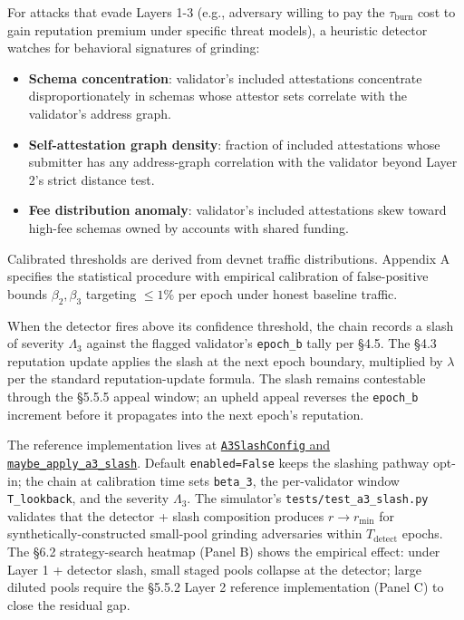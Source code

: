 \documentclass[
  11pt,
]{article}
\providecommand{\tightlist}{%
  \setlength{\itemsep}{0pt}\setlength{\parskip}{0pt}}
\begin{document}
For attacks that evade Layers 1-3 (e.g., adversary willing to pay the
\(\tau_{\text{burn}}\) cost to gain reputation premium under specific
threat models), a heuristic detector watches for behavioral signatures
of grinding:

\begin{itemize}
\tightlist
\item
  \textbf{Schema concentration}: validator's included attestations
  concentrate disproportionately in schemas whose attestor sets
  correlate with the validator's address graph.
\item
  \textbf{Self-attestation graph density}: fraction of included
  attestations whose submitter has any address-graph correlation with
  the validator beyond Layer 2's strict distance test.
\item
  \textbf{Fee distribution anomaly}: validator's included attestations
  skew toward high-fee schemas owned by accounts with shared funding.
\end{itemize}

Calibrated thresholds are derived from devnet traffic distributions.
Appendix A specifies the statistical procedure with empirical
calibration of false-positive bounds \(\beta_2, \beta_3\) targeting
\(\leq 1\%\) per epoch under honest baseline traffic.

When the detector fires above its confidence threshold, the chain
records a slash of severity \(\Lambda_3\) against the flagged
validator's \texttt{epoch\_b} tally per §4.5. The §4.3 reputation update
applies the slash at the next epoch boundary, multiplied by \(\lambda\)
per the standard reputation-update formula. The slash remains
contestable through the §5.5.5 appeal window; an upheld appeal reverses
the \texttt{epoch\_b} increment before it propagates into the next
epoch's reputation.

The reference implementation lives at
\href{https://github.com/ligate-io/ligate-research/blob/main/prototypes/poua-sim/src/poua_sim/a3_slash.py}{\texttt{A3SlashConfig}
and \texttt{maybe\_apply\_a3\_slash}}. Default \texttt{enabled=False}
keeps the slashing pathway opt-in; the chain at calibration time sets
\texttt{beta\_3}, the per-validator window \texttt{T\_lookback}, and the
severity \(\Lambda_3\). The simulator's
\texttt{tests/test\_a3\_slash.py} validates that the detector + slash
composition produces \(r \to r_{\min}\) for synthetically-constructed
small-pool grinding adversaries within \(T_{\text{detect}}\) epochs. The
§6.2 strategy-search heatmap (Panel B) shows the empirical effect: under
Layer 1 + detector slash, small staged pools collapse at the detector;
large diluted pools require the §5.5.2 Layer 2 reference implementation
(Panel C) to close the residual gap.
\end{document}
